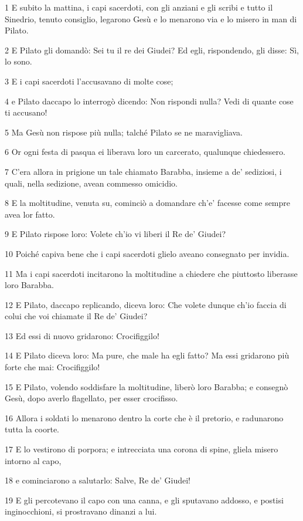 \par 1 E subito la mattina, i capi sacerdoti, con gli anziani e gli scribi e tutto il Sinedrio, tenuto consiglio, legarono Gesù e lo menarono via e lo misero in man di Pilato.
\par 2 E Pilato gli domandò: Sei tu il re dei Giudei? Ed egli, rispondendo, gli disse: Sì, lo sono.
\par 3 E i capi sacerdoti l'accusavano di molte cose;
\par 4 e Pilato daccapo lo interrogò dicendo: Non rispondi nulla? Vedi di quante cose ti accusano!
\par 5 Ma Gesù non rispose più nulla; talché Pilato se ne maravigliava.
\par 6 Or ogni festa di pasqua ei liberava loro un carcerato, qualunque chiedessero.
\par 7 C'era allora in prigione un tale chiamato Barabba, insieme a de' sediziosi, i quali, nella sedizione, avean commesso omicidio.
\par 8 E la moltitudine, venuta su, cominciò a domandare ch'e' facesse come sempre avea lor fatto.
\par 9 E Pilato rispose loro: Volete ch'io vi liberi il Re de' Giudei?
\par 10 Poiché capiva bene che i capi sacerdoti glielo aveano consegnato per invidia.
\par 11 Ma i capi sacerdoti incitarono la moltitudine a chiedere che piuttosto liberasse loro Barabba.
\par 12 E Pilato, daccapo replicando, diceva loro: Che volete dunque ch'io faccia di colui che voi chiamate il Re de' Giudei?
\par 13 Ed essi di nuovo gridarono: Crocifiggilo!
\par 14 E Pilato diceva loro: Ma pure, che male ha egli fatto? Ma essi gridarono più forte che mai: Crocifiggilo!
\par 15 E Pilato, volendo soddisfare la moltitudine, liberò loro Barabba; e consegnò Gesù, dopo averlo flagellato, per esser crocifisso.
\par 16 Allora i soldati lo menarono dentro la corte che è il pretorio, e radunarono tutta la coorte.
\par 17 E lo vestirono di porpora; e intrecciata una corona di spine, gliela misero intorno al capo,
\par 18 e cominciarono a salutarlo: Salve, Re de' Giudei!
\par 19 E gli percotevano il capo con una canna, e gli sputavano addosso, e postisi inginocchioni, si prostravano dinanzi a lui.
